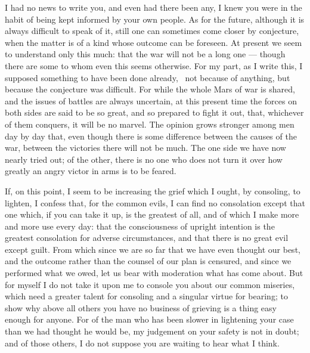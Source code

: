 

 I had no news to write you, and even had there been any, I knew you were in the habit of being kept informed by your own people. As for the future, although it is always difficult to speak of it, still one can sometimes come closer by conjecture, when the matter is of a kind whose outcome can be foreseen. At present we seem to understand only this much: that the war will not be a long one --- though there are some to whom even this seems otherwise. For my part, as I write this, I supposed something to have been done already, \dag\ not because of anything, but because the conjecture was difficult. For while the whole Mars of war is shared, and the issues of battles are always uncertain, at this present time the forces on both sides are said to be so great, and so prepared to fight it out, that, whichever of them conquers, it will be no marvel. The opinion grows stronger among men day by day that, even though there is some difference between the causes of the war, between the victories there will not be much. The one side we have now nearly tried out; of the other, there is no one who does not turn it over how greatly an angry victor in arms is to be feared.

 If, on this point, I seem to be increasing the grief which I ought, by consoling, to lighten, I confess that, for the common evils, I can find no consolation except that one which, if you can take it up, is the greatest of all, and of which I make more and more use every day: that the consciousness of upright intention is the greatest consolation for adverse circumstances, and that there is no great evil except guilt. From which since we are so far that we have even thought our best, and the outcome rather than the counsel of our plan is censured, and since we performed what we owed, let us bear with moderation what has come about. But for myself I do not take it upon me to console you about our common miseries, which need a greater talent for consoling and a singular virtue for bearing; to show why above all others you have no business of grieving is a thing easy enough for anyone. For of the man who has been slower in lightening your case than we had thought he would be, my judgement on your safety is not in doubt; and of those others, I do not suppose you are waiting to hear what I think.

